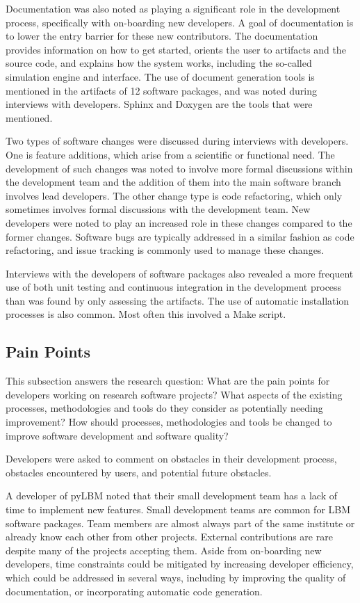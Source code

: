 \documentclass[12pt, notitlepage]{article}
\begin{document}
Documentation was also noted as playing a significant role in the development process, specifically with on-boarding new developers. A goal of documentation is to lower the entry barrier for these new contributors. The documentation provides information on how to get started, orients the user to artifacts and the source code, and explains how the system works, including the so-called simulation engine and interface. The use of document generation tools is mentioned in the artifacts of 12 software packages, and was noted during interviews with developers. Sphinx and Doxygen are the tools that were mentioned. 

Two types of software changes were discussed during interviews with developers. One is feature additions, which arise from a scientific or functional need. The development of such changes was noted to involve more formal discussions within the development team and the addition of them into the main software branch involves lead developers. The other change type is code refactoring, which only sometimes involves formal discussions with the development team. New developers were noted to play an increased role in these changes compared to the former changes. Software bugs are typically addressed in a similar fashion as code refactoring, and issue tracking is commonly used to manage these changes. 

Interviews with the developers of software packages also revealed a more frequent use of both unit testing and continuous integration in the development process than was found by only assessing the artifacts. The use of automatic installation processes is also common. Most often this involved a Make script.


\subsection{Pain Points}\label{painpoints}

This subsection answers the research question: What are the pain points for developers working on research software projects? What aspects of the existing processes, methodologies and tools do they consider as potentially needing improvement? How should processes, methodologies and tools be changed to improve software development and software quality?

Developers were asked to comment on obstacles in their development process, obstacles encountered by users, and potential future obstacles. 

A developer of pyLBM noted that their small development team has a lack of time to implement new features. Small development teams are common for LBM software packages. Team members are almost always part of the same institute or already know each other from other projects. External contributions are rare despite many of the projects accepting them. Aside from on-boarding new developers, time constraints could be mitigated by increasing developer efficiency, which could be addressed in several ways, including by improving the quality of documentation, or incorporating automatic code generation.
\end{document}
